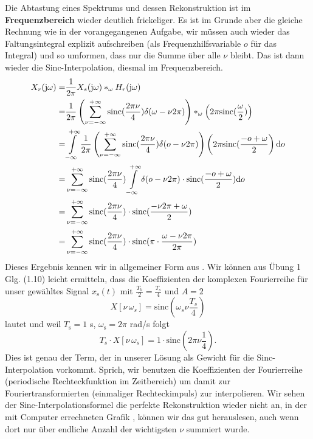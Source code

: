 \begin{Loesung}
Die Abtastung eines Spektrums und dessen Rekonstruktion ist im
\textbf{Frequenzbereich} wieder deutlich frickeliger.
Es ist im Grunde aber die gleiche Rechnung wie in der vorangegangenen Aufgabe,
wir müssen auch wieder das Faltungsintegral explizit aufschreiben (als
Frequenzhilfsvariable $o$ für das Integral) und so umformen, dass
nur die Summe über alle $\nu$ bleibt. Das ist dann wieder die Sinc-Interpolation,
diesmal im Frequenzbereich.
\begin{align}
X_r(\im\omega) =& \frac{1}{2\pi} X_s(\im\omega) \ast_\omega H_r(\im\omega)\\
=&\frac{1}{2\pi}
\left(\sum_{\nu=-\infty}^{+\infty} \mathrm{sinc}(\frac{2\pi\nu}{4}) \delta(\omega-\nu 2 \pi)\right)
\ast_\omega
\left(2\pi\mathrm{sinc}(\frac{\omega}{2})\right)\\
=&\int\limits_{-\infty}^{+\infty}
\frac{1}{2\pi}
\left(\sum_{\nu=-\infty}^{+\infty} \mathrm{sinc}(\frac{2\pi\nu}{4}) \delta(o-\nu 2 \pi)\right)
\left(2\pi\mathrm{sinc}(\frac{-o+\omega}{2}\right)
\fsd o\\
=&
\sum_{\nu=-\infty}^{+\infty} \mathrm{sinc}(\frac{2\pi\nu}{4})
\int\limits_{-\infty}^{+\infty}
\delta(o-\nu 2 \pi)\cdot
\mathrm{sinc}(\frac{-o+\omega}{2})
\fsd o\\
=&
\sum_{\nu=-\infty}^{+\infty} \mathrm{sinc}(\frac{2\pi\nu}{4})\cdot
\mathrm{sinc}(\frac{-\nu 2 \pi+\omega}{2})\\
=&
\sum_{\nu=-\infty}^{+\infty} \mathrm{sinc}(\frac{2\pi\nu}{4})\cdot
\mathrm{sinc}(\pi\cdot\frac{\omega-\nu 2 \pi}{2\pi})
\end{align}
Dieses Ergebnis kennen wir in allgemeiner Form aus .
%
Wir können aus Übung 1 Glg. (1.10) leicht ermitteln, dass die Koeffizienten
der komplexen Fourierreihe für unser gewähltes Signal $x_\mathrm{s}(t)$ mit
$\frac{T_h}{2} = \frac{T_s}{4}$ und $A=2$
\begin{equation}
X[\nu\,\omega_s] = \mathrm{sinc}(\omega_s \nu \frac{T_s}{4})
\end{equation}
lautet und weil $T_\mathrm{s}=1$ s, $\omega_\mathrm{s}=2\pi$ rad/s folgt
\begin{equation}
T_s \cdot X[\nu\,\omega_s] = 1 \cdot \mathrm{sinc}(2\pi \nu \frac{1}{4}).
\end{equation}
Dies ist genau der Term, der in unserer Lösung als Gewicht für die Sinc-Interpolation
vorkommt. Sprich, wir benutzen die Koeffizienten der Fourierreihe
(periodische Rechteckfunktion im Zeitbereich) um damit
zur Fouriertransformierten (einmaliger Rechteckimpuls) zur interpolieren.
Wir sehen der Sinc-Interpolationsformel die perfekte Rekonstruktion wieder nicht an,
in der mit Computer errechneten Grafik ,
können wir das gut herauslesen, auch wenn dort nur über endliche Anzahl der
wichtigsten $\nu$ summiert wurde.


\end{Loesung}
